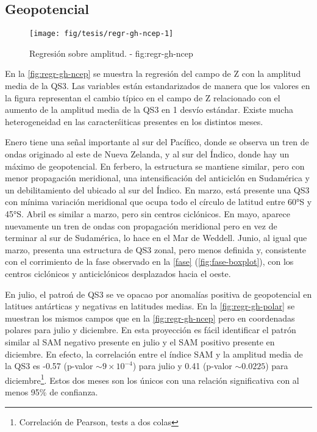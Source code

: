 \documentclass[spanish,a4paper,12p]{book}
\let\rmarkdownfootnote\footnote%
\def\footnote{\protect\rmarkdownfootnote}
\begin{document}
\subsection{Geopotencial}\label{geopotencial}

\begin{landscape}\begin{figure}

{\centering \texttt{[image: fig/tesis/regr-gh-ncep-1]} 

}

\caption{Regresión sobre amplitud. - fig:regr-gh-ncep}\label{fig:regr-gh-ncep}
\end{figure}
\end{landscape}

En la \autoref{fig:regr-gh-ncep} se muestra la regresión del campo de Z
con la amplitud media de la QS3. Las variables están estandarizados de
manera que los valores en la figura representan el cambio típico en el
campo de Z relacionado con el aumento de la amplitud media de la QS3 en
1 desvío estándar. Existe mucha heterogeneidad en las caracterśiticas
presentes en los distintos meses.

Enero tiene una señal importante al sur del Pacífico, donde se observa
un tren de ondas originado al este de Nueva Zelanda, y al sur del
Índico, donde hay un máximo de geopotencial. En ferbero, la estructura
se mantiene similar, pero con menor propagación meridional, una
intensificación del anticiclón en Sudamérica y un debilitamiento del
ubicado al sur del Índico. En marzo, está presente una QS3 con mínima
variación meridional que ocupa todo el círculo de latitud entre 60°S y
45°S. Abril es similar a marzo, pero sin centros ciclónicos. En mayo,
aparece nuevamente un tren de ondas con propagación meridional pero en
vez de terminar al sur de Sudamérica, lo hace en el Mar de Weddell.
Junio, al igual que marzo, presenta una estructura de QS3 zonal, pero
menos definida y, consistente con el corrimiento de la fase observado en
la \autoref{fase} (\autoref{fig:fase-boxplot}), con los centros
ciclónicos y anticiclónicos desplazados hacia el oeste.

En julio, el patroń de QS3 se ve opacao por anomalías positiva de
geopotencial en latitues antárticas y negativas en latitudes medias. En
la \autoref{fig:regr-gh-polar} se muestran los mismos campos que en la
\autoref{fig:regr-gh-ncep} pero en coordenadas polares para julio y
diciembre. En esta proyección es fácil identificar el patrón similar al
SAM negativo presente en julio y el SAM positivo
presente en diciembre. En efecto, la correlación entre el índice SAM y
la amplitud media de la QS3 es -0.57 (p-valor \(\sim 9\times 10^{-4}\))
para julio y 0.41 (p-valor \(\sim 0.0225\)) para
diciembre\footnote{Correlación de Pearson, tests a dos colas}. Estos dos
meses son los únicos con una relación significativa con al menos 95\% de
confianza.
\end{document}
